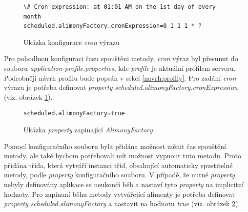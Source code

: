             \begin{figure}
                \begin{verbatim}
\# Cron expression: at 01:01 AM on the 1st day of every month
scheduled.alimonyFactory.cronExpression=0 1 1 1 * ?
                \end{verbatim}
                \caption{Ukázka konfigurace \textit{cron} výrazu} 
                \label{code:cron-expression}
            \end{figure}
            Pro pohodlnou konfiguraci času spouštěni metody, \textit{cron} výraz byl přesunut do souboru \textit{application-{profile}.properties}, kde \textit{profile} je aktuální profilem serveru. Podrobněji návrh profilu bude popsán v sekci \ref{navrh:profily}. Pro zadání \textit{cron} výrazu je potřeba definovat \textit{property} \textit{scheduled.alimonyFactory.cronExpression} (viz. obrázek \ref{code:cron-expression}).
            
            \begin{figure}
                \begin{verbatim}
scheduled.alimonyFactory=true
                \end{verbatim}
                \caption{Ukázka \textit{property} zapinající \textit{AlimonyFactory}} 
                \label{code:alimony-factory-true}
            \end{figure}
            Pomocí konfiguračního souboru byla přidána možnost měnit čas spouštění metody, ale také bychom potřebovali mít možnost vypnout tuto metodu. Proto přidána třída, která vytváří instanci tříd, obsahující automaticky spustitelné metody, podle \textit{property} konfiguračního souboru. V případě, že nutné \textit{property} nebyly definovány aplikace se neukončí běh a nastaví tyto \textit{property} na implicitní hodnoty. Pro zapínaní běhu metody vytvářející alimenty je potřeba definovat \textit{property} \textit{scheduled.alimonyFactory} a nastavit na hodnotu \textit{true} (viz. obrázek \ref{code:alimony-factory-true}).
        
